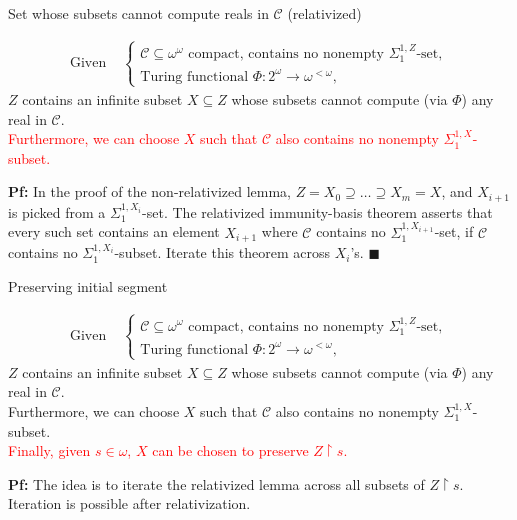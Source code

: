 \begin{frame}{Set whose subsets cannot compute reals in $\mathcal{C}$
(relativized)}
  \begin{main-lemma*}[\textcolor{red}{Relativized}]
    \begin{align*}
      \text{Given } &\begin{cases}
        \mathcal{C}\subseteq\omega^\omega \text{ compact, contains
        no nonempty } \Sigma^{1,Z}_1\text{-set},\\
        \text{Turing functional } \Phi:2^{\omega}\rightarrow
        \omega^{<\omega},
      \end{cases}
    \end{align*}
    $Z$ contains an infinite subset $X\subseteq Z$ whose subsets cannot
    compute (via $\Phi$) any real in $\mathcal{C}$.\\
    \vspace{0.5em}
    \textcolor{red}{Furthermore, we can choose $X$ such that $\mathcal{C}$
    also contains no nonempty $\Sigma_1^{1,X}$-subset.}
  \end{main-lemma*}

  \textbf{Pf:} In the proof of the non-relativized lemma, $Z=X_0
  \supseteq \ldots\supseteq X_m=X$, and $X_{i+1}$ is picked from a
  $\Sigma^{1,X_i}_1$-set. The relativized immunity-basis theorem asserts
  that every such set contains an element $X_{i+1}$ where $\mathcal{C}$
  contains no $\Sigma_1^{1,X_{i+1}}$-set, if $\mathcal{C}$ contains no
  $\Sigma^{1,X_i}_1$-subset. Iterate this theorem across $X_i$'s.
  $\blacksquare$
\end{frame}

\begin{frame}{Preserving initial segment}
  \begin{main-lemma*}
    \begin{align*}
      \text{Given } &\begin{cases}
        \mathcal{C}\subseteq\omega^\omega \text{ compact, contains
        no nonempty } \Sigma^{1,Z}_1\text{-set},\\
        \text{Turing functional } \Phi:2^{\omega}\rightarrow
        \omega^{<\omega},
      \end{cases}
    \end{align*}
    $Z$ contains an infinite subset $X\subseteq Z$ whose subsets cannot
    compute (via $\Phi$) any real in $\mathcal{C}$.\\
    \vspace{0.5em}
    Furthermore, we can choose $X$ such that $\mathcal{C}$ also contains no
    nonempty $\Sigma_1^{1,X}$-subset.\\
    \vspace{0.5em}
    \textcolor{red}{Finally, given $s\in\omega$, $X$ can be chosen to
    preserve $Z\restriction s$.}
  \end{main-lemma*}

  \vspace{1em}
  \textbf{Pf:} The idea is to iterate the relativized lemma across all
  subsets of $Z\restriction s$. Iteration is possible after relativization.
\end{frame}

